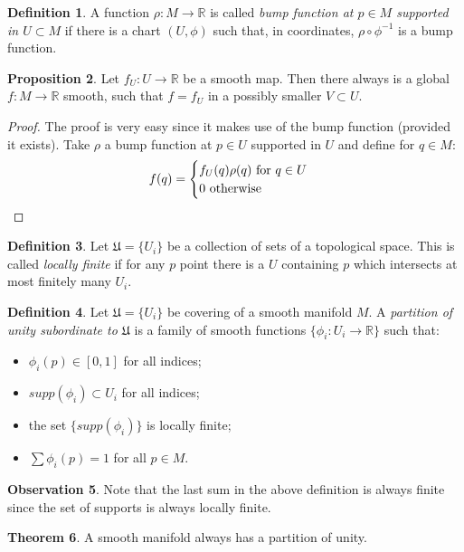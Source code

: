 \documentclass[12pt,a4paper]{report}
\theoremstyle{definition}
\newtheorem{Def}{Definition}[chapter]
\theoremstyle{Theorem}
\newtheorem{Theo}[Def]{Theorem}
\newtheorem{Prop}[Def]{Proposition}
\theoremstyle{definition}
\theoremstyle{definition}
\newtheorem{Obs}[Def]{Observation}
\begin{document}
			\begin{Def}
				A function $\rho:M\rightarrow \mathbb{R}$ is called \textit{bump function  at $p\in M$ supported in $U\subset M$} if there is a chart $(U,\phi)$ such that, in coordinates, $\rho\circ \phi^{-1}$ is a bump function.
			\end{Def}
			\begin{Prop}
				Let $f_U:U\rightarrow\mathbb{R}$ be a smooth map. Then there always is a global $f:M\rightarrow \mathbb{R}$ smooth, such that $f=f_U$ in a possibly smaller $V\subset U$.
			\end{Prop}
			\begin{proof}
				The proof is very easy since it makes use of the bump function (provided it exists). Take $\rho$ a bump function at $p\in U$ supported in $U$ and define for $q\in M$:
				$$f(q)=\begin{cases}
					f_U(q)\rho(q)\hbox{ for }q\in U\\
					0 \hbox{ otherwise}
				\end{cases}$$
			\end{proof}
			\begin{Def}
				Let $\mathfrak{U}=\{U_i\}$ be a collection of sets of a topological space. This is called \textit{locally finite} if for any $p$ point there is a $U$ containing $p$ which intersects at most finitely many $U_i$. 
			\end{Def}
			\begin{Def}
				Let $\mathfrak{U}=\{U_i\}$ be covering of a smooth manifold $M$. A \textit{partition of unity subordinate to $\mathfrak{U}$} is a family of smooth functions $\{\phi_i:U_i\rightarrow\mathbb{R}\}$ such that:
				\begin{itemize}
					\item $\phi_i(p)\in[0,1]$ for all indices;
					\item $supp(\phi_i)\subset U_i$ for all indices;
					\item the set $\{supp(\phi_i)\}$ is locally finite;
					\item $\sum \phi_i(p)=1$ for all $p\in M$.
				\end{itemize}
			\end{Def}
			\begin{Obs}
				Note that the last sum in the above definition is always finite since the set of supports is always locally finite.
			\end{Obs}
			\begin{Theo}
				A smooth manifold always has a partition of unity.
			\end{Theo}
\end{document}
